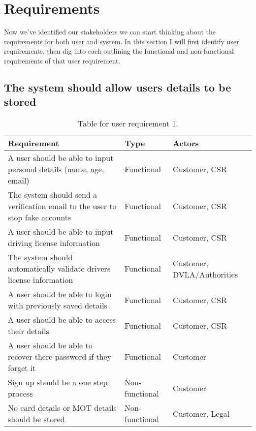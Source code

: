 \section{Requirements}
  Now we've identified our stakeholders we can start thinking about the requirements for both user and system. In this section I will first identify user
  requirements, then dig into each outlining the functional and non-functional requirements of that user requirement.

  \subsection{The system should allow users details to be stored}
    \begin{table}[H]
      \centering
      \begin{tabular}{|p{}|p{}|p{}|}
        \hline
        Requirement & Type & Actors \\ \hline
        A user should be able to input personal details (name, age, email) & Functional & Customer, CSR \\ \hline
        The system should send a verification email to the user to stop fake accounts & Functional & Customer, CSR \\ \hline
        A user should be able to input driving license information & Functional & Customer, CSR \\ \hline
        The system should automatically validate drivers license information & Functional & Customer, DVLA/Authorities \\ \hline
        A user should be able to login with previously saved details & Functional & Customer, CSR \\ \hline
        A user should be able to access their details & Functional & Customer, CSR \\ \hline
        A user should be able to recover there password if they forget it & Functional  & Customer \\ \hline
        Sign up should be a one step process & Non-functional & Customer \\ \hline
        No card details or MOT details should be stored & Non-functional & Customer, Legal \\ \hline
      \end{tabular}
      \caption{Table for user requirement 1.}
    \end{table}

